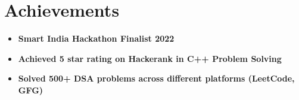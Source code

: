 \documentclass[letterpaper,11pt]{article}
\begin{document}
\section{Achievements}
\begin{itemize}[leftmargin=0.15in, label={\textbullet}]
  \item \textbf{Smart India Hackathon Finalist 2022}
  \item \textbf{Achieved 5 star rating on Hackerank in C++ Problem Solving}
  \item \textbf{Solved 500+ DSA problems across different platforms (LeetCode, GFG)}
\end{itemize}

\end{document}
